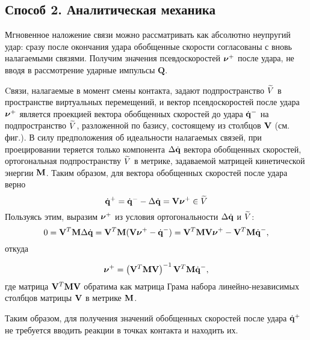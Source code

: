 
\subsection{Способ 2. Аналитическая механика}
Мгновенное наложение связи можно рассматривать как абсолютно неупругий удар: сразу после окончания удара обобщенные скорости согласованы с вновь налагаемыми связями. Получим  значения псевдоскоростей $\boldsymbol{\mathbf{\nu}}^+$ после удара, не вводя в рассмотрение ударные импульсы $\mathbf{Q}$.

Cвязи, налагаемые в момент смены контакта, задают подпространство $\widetilde{V}$ в пространстве виртуальных перемещений, и вектор псевдоскоростей после удара $\boldsymbol{\mathbf{\nu}}^+$ является проекцией  вектора обобщенных скоростей до удара $\dot{\mathbf{q}}^-$ на подпространство $\widetilde{V}$, разложенной по базису, состоящему из столбцов $\mathbf{V}$ (см. фиг.). В силу предположения об идеальности налагаемых связей, при проецировании теряется только компонента $\Delta\dot{\mathbf{q}}$ вектора обобщенных скоростей, ортогональная подпространству $\widetilde{V}$ в метрике, задаваемой матрицей кинетической энергии $\mathbf{M}$. Таким образом, для вектора обобщенных скоростей после удара верно 
$$\dot{\mathbf{q}}^+ = \dot{\mathbf{q}}^- - \Delta\dot{\mathbf{q}} = \mathbf{V}\boldsymbol{\mathbf{\nu}}^+ \in \widetilde{V}$$ Пользуясь этим, выразим $\boldsymbol{\mathbf{\nu}}^+$ из условия ортогональности $\Delta\dot{\mathbf{q}}$ и $\widetilde{V}$:
\begin{equation*}
0 = \mathbf{V}^T\mathbf{M}\Delta\dot{\mathbf{q}} = \mathbf{V}^T\mathbf{M}(\mathbf{V}\boldsymbol{\mathbf{\nu}}^+ - \dot{\mathbf{q}}^-) = \mathbf{V}^T\mathbf{M}\mathbf{V}\boldsymbol{\mathbf{\nu}}^+ - \mathbf{V}^T\mathbf{M}\dot{\mathbf{q}}^-,
\end{equation*}
откуда

\begin{equation*}
\boldsymbol{\mathbf{\nu}}^+ = \left( \mathbf{V}^T\mathbf{M}\mathbf{V} \right)^{-1}\mathbf{V}^T\mathbf{M}\dot{\mathbf{q}}^-,
\end{equation*}
где матрица $\mathbf{V}^T\mathbf{M}\mathbf{V}$ обратима как матрица Грама набора линейно-независимых столбцов матрицы $\mathbf{V}$ в метрике $\mathbf{M}$.

Таким образом, для получения значений обобщенных скоростей после удара $\dot{\mathbf{q}}^+$ не требуется вводить реакции в точках контакта и находить их.